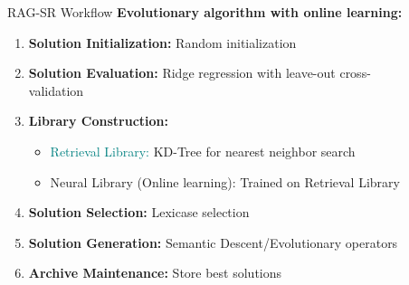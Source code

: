 \documentclass[final]{beamer}
\newcommand{\hlblue}[1]{\textcolor{mainblue}{#1}}
\newcommand{\hlpurple}[1]{\textcolor{accent}{#1}}
\newcommand{\hlteal}[1]{\textcolor{teal}{#1}}
\newlength{\sepwid}
\newlength{\onecolwid}
\begin{document}
\begin{frame}[t]
\begin{columns}[t]
\begin{column}{\onecolwid}
\begin{block}{RAG-SR Workflow}
                    \textbf{\hlblue{Evolutionary algorithm with online learning:}}
                    \begin{enumerate}
                        \item \textbf{Solution Initialization:} Random initialization
                        \item \textbf{Solution Evaluation:} Ridge regression with leave-out cross-validation
                        \item \textbf{Library Construction:}
                        \begin{itemize}
                            \item \hlteal{Retrieval Library:} KD-Tree for nearest neighbor search
                            \item \hlpurple{Neural Library (Online learning):} Trained on Retrieval Library
                        \end{itemize}
                        \item \textbf{Solution Selection:} Lexicase selection
                        \item \textbf{Solution Generation:} Semantic Descent/Evolutionary operators
                        \item \textbf{Archive Maintenance:} Store best solutions
                    \end{enumerate}
                \end{block}



            \end{column} %

            \begin{column}{\sepwid}\end{column} %

            \begin{column}{\onecolwid} %




\end{column}
\end{columns}
\end{frame}
\end{document}

